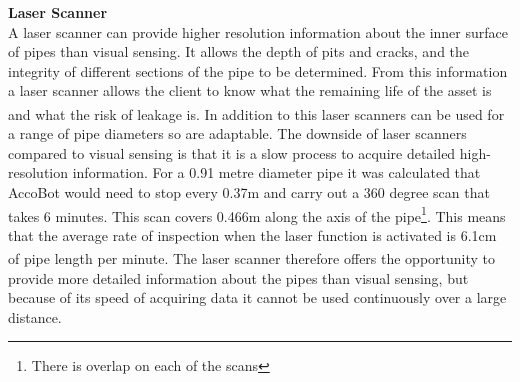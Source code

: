 \documentclass[11pt]{article}		%
\newcommand{\supercite}[1]{\textsuperscript{\cite{#1}}}		%
\begin{document}
	        \textbf{Laser Scanner}
	        \\
	        A laser scanner can provide higher resolution information about the inner surface of pipes than visual sensing. It allows the depth of pits and cracks, and the integrity of different sections of the pipe to be determined. From this information a laser scanner allows the client to know what the remaining life of the asset is and what the risk of leakage is.\supercite{2g_robotics} In addition to this laser scanners can be used for a range of pipe diameters so are adaptable. The downside of laser scanners compared to visual sensing is that it is a slow process to acquire detailed high-resolution information. For a 0.91 metre diameter pipe it was calculated that AccoBot would need to stop every 0.37m and carry out a 360 degree scan that takes 6 minutes. This scan covers 0.466m along the axis of the pipe\footnote{There is overlap on each of the scans}. This means that the average rate of inspection when the laser function is activated is 6.1cm of pipe length per minute.\supercite{2g_robotics} The laser scanner therefore offers the opportunity to provide more detailed information about the pipes than visual sensing, but because of its speed of acquiring data it cannot be used continuously over a large distance.
	        
\end{document}
